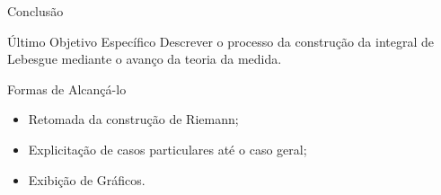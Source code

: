 	\begin{frame}{Conclusão}
		\begin{block}{Último Objetivo Específico}
			\justify Descrever o processo da construção da integral de Lebesgue mediante o avanço da teoria da medida.
		\end{block}
		\begin{block}{Formas de Alcançá-lo}
			\begin{itemize}[<+->]
				\item Retomada da construção de Riemann;
				\item Explicitação de casos particulares até o caso geral;
				\item Exibição de Gráficos.
			\end{itemize}
		\end{block}
	\end{frame}















